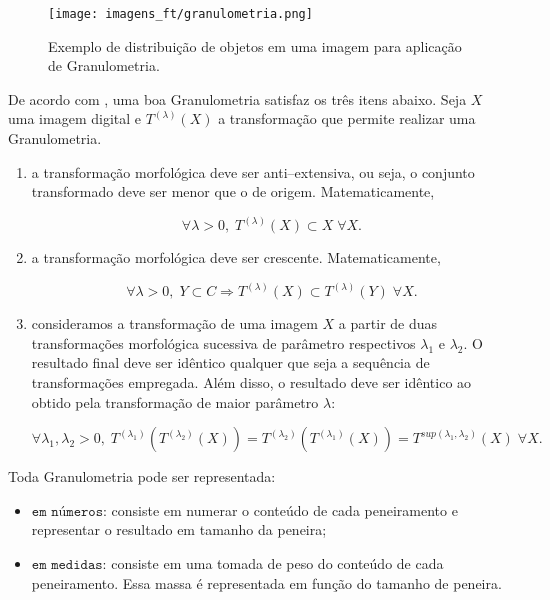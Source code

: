 \begin{figure}[H]
	\centering
	\texttt{[image: imagens\_ft/granulometria.png]}
	\caption{Exemplo de distribuição de objetos em uma imagem para aplicação de Granulometria.}
	\label{fig:granulometria}
\end{figure}

De acordo com \cite{r9}, uma boa Granulometria satisfaz os três itens abaixo. Seja $X$ uma imagem digital e $T^{(\lambda)}(X)$ a transformação que permite realizar uma Granulometria.

\begin{enumerate}
	\item a transformação morfológica deve ser anti--extensiva, ou seja, o conjunto transformado deve ser menor que o de origem. Matematicamente, 
	
	\begin{equation}
		\forall \lambda > 0, \; T^{(\lambda)}(X) \subset X \; \forall X.
	\end{equation}
	
	\item a transformação morfológica deve ser crescente. Matematicamente,
	
	\begin{equation}
		\forall \lambda > 0, \; Y \subset C \Rightarrow T^{(\lambda)}(X) \subset T^{(\lambda)}(Y) \; \forall X.
	\end{equation}
	
	\item consideramos a transformação de uma imagem $X$ a partir de duas transformações morfológica sucessiva de parâmetro respectivos $\lambda_1$ e $\lambda_2$. O resultado final deve ser idêntico qualquer que seja a sequência de transformações empregada. Além disso, o resultado deve ser idêntico ao obtido pela transformação de maior parâmetro $\lambda$:
	
	\begin{equation}
		\forall \lambda_1, \lambda_2 > 0, \; T^{(\lambda_1)}(T^{(\lambda_2)}(X)) = T^{(\lambda_2)}(T^{(\lambda_1)}(X)) = T^{sup(\lambda_1, \lambda_2)}(X) \; \forall X.
	\end{equation}
\end{enumerate}

Toda Granulometria pode ser representada: 

\begin{itemize}
	\item $\texttt{em números}$: consiste em numerar o conteúdo de cada peneiramento e representar o resultado em tamanho da peneira; 
	
	\item $\texttt{em medidas}$: consiste em uma tomada de peso do conteúdo de cada peneiramento. Essa massa é representada em função do tamanho de peneira.
\end{itemize}

